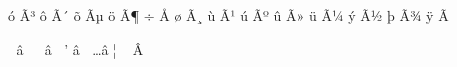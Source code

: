 \mubyte ^^f3 ^^c3^^b3\endmubyte %
\mubyte ^^f4 ^^c3^^b4\endmubyte %
\mubyte ^^f5 ^^c3^^b5\endmubyte %
\mubyte ^^f6 ^^c3^^b6\endmubyte %
\mubyte ^^f7 ^^c5^^93\endmubyte %
\mubyte ^^f8 ^^c3^^b8\endmubyte %
\mubyte ^^f9 ^^c3^^b9\endmubyte %
\mubyte ^^fa ^^c3^^ba\endmubyte %
\mubyte ^^fb ^^c3^^bb\endmubyte %
\mubyte ^^fc ^^c3^^bc\endmubyte %
\mubyte ^^fd ^^c3^^bd\endmubyte %
\mubyte ^^fe ^^c3^^be\endmubyte %
\mubyte ^^ff ^^c3^^9f\endmubyte %

\mubyte ^^15  ^^e2^^80^^93\endmubyte     %
\mubyte ^^16  ^^e2^^80^^94\endmubyte     %
\mubyte '     ^^e2^^80^^99\endmubyte     %
\mubyte \dots ^^e2^^80^^a6\endmubyte     %
\mubyte ~     ^^c2^^a0\endmubyte         %


\endinput

